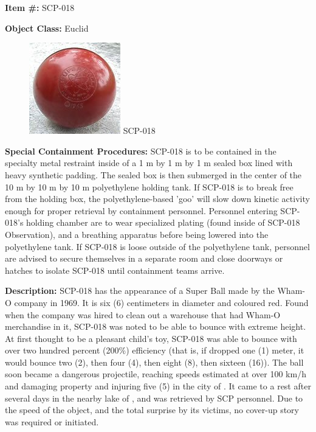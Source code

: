 
\textbf{Item \#:} SCP-018

\textbf{Object Class:} Euclid

\begin{figure}[h]
\begin{center}
\includegraphics[scale=1.3]{scp/018.jpg}
\linebreak SCP-018
\end{center}
\end{figure}

\textbf{Special Containment Procedures:} SCP-018 is to be contained in the specialty metal restraint inside of a 1 m by 1 m by 1 m sealed box lined with heavy synthetic padding. The sealed box is then submerged in the center of the 10 m by 10 m by 10 m polyethylene holding tank. If SCP-018 is to break free from the holding box, the polyethylene-based 'goo' will slow down kinetic activity enough for proper retrieval by containment personnel. Personnel entering SCP-018's holding chamber are to wear specialized plating (found inside of SCP-018 Observation), and a breathing apparatus before being lowered into the polyethylene tank. If SCP-018 is loose outside of the polyethylene tank, personnel are advised to secure themselves in a separate room and close doorways or hatches to isolate SCP-018 until containment teams arrive.

\textbf{Description:} SCP-018 has the appearance of a Super Ball made by the Wham-O company in 1969. It is six (6) centimeters in diameter and coloured red. Found when the  company was hired to clean out a warehouse that had Wham-O merchandise in it, SCP-018 was noted to be able to bounce with extreme height. At first thought to be a pleasant child's toy, SCP-018 was able to bounce with over two hundred percent (200\%) efficiency (that is, if dropped one (1) meter, it would bounce two (2), then four (4), then eight (8), then sixteen (16)). The ball soon became a dangerous projectile, reaching speeds estimated at over 100 km/h and damaging property and injuring five (5) in the city of . It came to a rest after several days in the nearby lake of , and was retrieved by SCP personnel. Due to the speed of the object, and the total surprise by its victims, no cover-up story was required or initiated.

